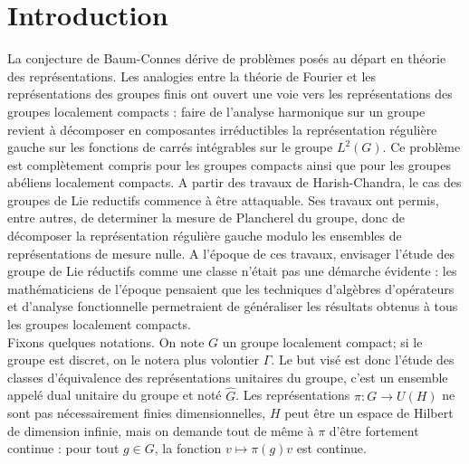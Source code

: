 \section{Introduction}

La conjecture de Baum-Connes dérive de problèmes posés au départ en théorie des représentations. Les analogies entre la théorie de Fourier et les représentations des groupes finis ont ouvert une voie vers les représentations des groupes localement compacts : faire de l'analyse harmonique sur un groupe revient à décomposer en composantes irréductibles la représentation régulière gauche sur les fonctions de carrés intégrables sur le groupe $L^2(G)$. Ce problème est complètement compris pour les groupes compacts ainsi que pour les groupes abéliens localement compacts. A partir des travaux de Harish-Chandra, le cas des groupes de Lie reductifs commence à être attaquable. Ses travaux ont permis, entre autres, de determiner la mesure de Plancherel du groupe, donc de décomposer la représentation régulière gauche modulo les ensembles de représentations de mesure nulle. A l'époque de ces travaux, envisager l'étude des groupe de Lie réductifs comme une classe n'était pas une démarche évidente : les mathématiciens de l'époque pensaient que les techniques d'algèbres d'opérateurs et d'analyse fonctionnelle permetraient de généraliser les résultats obtenus à tous les groupes localement compacts.\\

Fixons quelques notations. On note $G$ un groupe localement compact; si le groupe est discret, on le notera plus volontier $\Gamma$. Le but visé est donc l'étude des classes d'équivalence des représentations unitaires du groupe, c'est un ensemble appelé dual unitaire du groupe et noté $\hat G$. Les représentations $\pi : G \rightarrow U(H)$ ne sont pas nécessairement finies dimensionnelles, $H$ peut être un espace de Hilbert de dimension infinie, mais on demande tout de même à $\pi$ d'être fortement continue : pour tout $g\in G$, la fonction $v\mapsto \pi(g) v$ est continue.\\

